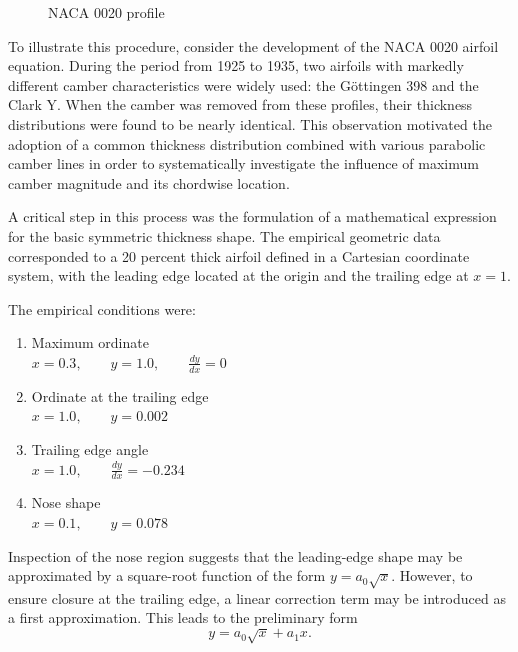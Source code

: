 \begin{figure}[h]
\centering
{}
\caption{NACA 0020 profile}
\end{figure}
To illustrate this procedure, 
consider the development of the NACA 0020 airfoil equation. 
During the period from 1925 to 1935, 
two airfoils with markedly different camber characteristics were widely used: the Göttingen 398 and the Clark Y.
When the camber was removed from these profiles, 
their thickness distributions were found to be nearly identical. 
This observation motivated the adoption of a common thickness distribution combined with various parabolic camber lines 
in order to systematically investigate the influence of maximum camber magnitude and its chordwise location.

A critical step in this process was the formulation of a mathematical expression 
for the basic symmetric thickness shape. The empirical geometric data corresponded 
to a 20 percent thick airfoil defined in a Cartesian coordinate system, with the leading 
edge located at the origin and the trailing edge at $x = 1$.

The empirical conditions were:
\begin{enumerate}
\renewcommand{\labelenumi}{(\arabic{enumi})}
\item Maximum ordinate\\[10pt]
$
x = 0.3, \qquad  y = 1.0, \qquad \displaystyle \frac{dy}{dx} = 0
$

\item Ordinate at the trailing edge\\[10pt]
$
x = 1.0, \qquad y = 0.002
$

\item Trailing edge angle\\[10pt]
$
x = 1.0, \qquad \displaystyle \frac{dy}{dx} = -0.234 
$

\item Nose shape\\[10pt]
$
x = 0.1, \qquad  y = 0.078 
$
\end{enumerate}
Inspection of the nose region suggests that the leading-edge shape may be 
approximated by a square-root function of the form $y = a_0 \sqrt{x}$. 
However, to ensure closure at the trailing edge, a linear correction term 
may be introduced as a first approximation. 
This leads to the preliminary form
\[
y = a_0 \sqrt{x} + a_1 x .
\]

